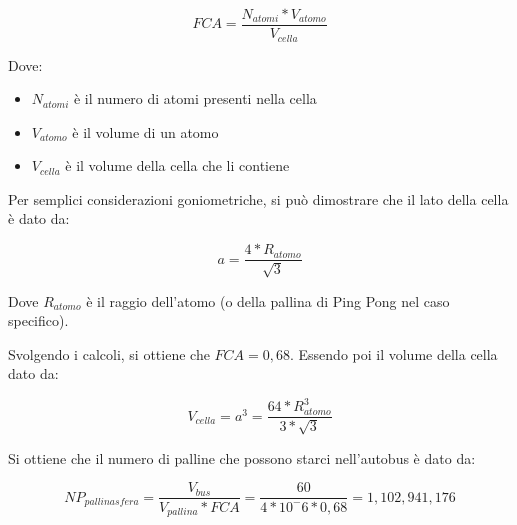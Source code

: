 \begin{equation}
    FCA = \frac{N_{atomi} * V_{atomo}}{V_{cella}}
\end{equation}

Dove:

\begin{itemize}
    \item $N_{atomi}$ è il numero di atomi presenti nella cella
    \item $V_{atomo}$ è il volume di un atomo
    \item $V_{cella}$ è il volume della cella che li contiene
\end{itemize}

Per semplici considerazioni goniometriche, si può dimostrare che il lato della cella è dato da:

\begin{equation}
    a = \frac{4 * R_{atomo}}{\sqrt{3}}
\end{equation}

Dove $R_{atomo}$ è il raggio dell'atomo (o della pallina di Ping Pong nel caso specifico).

Svolgendo i calcoli, si ottiene che $FCA = 0,68$.
Essendo poi il volume della cella dato da:

\begin{equation}
    V_{cella} = a^3 = \frac{64 * R_{atomo}^3}{3 * \sqrt{3}}
\end{equation}

Si ottiene che il numero di palline che possono starci nell'autobus è dato da:

\begin{equation}
    NP_{pallinasfera} = \frac{V_{bus}}{V_{pallina} * FCA} = \frac{60}{4 * 10^-6 * 0,68} = 1,102,941,176
\end{equation}